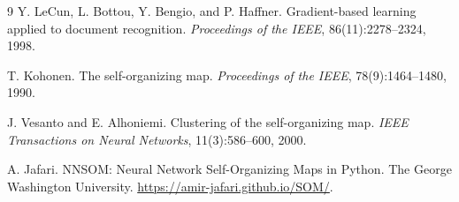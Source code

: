 \documentclass[11pt]{article}
\begin{document}
\begin{thebibliography}{9}
Y. LeCun, L. Bottou, Y. Bengio, and P. Haffner.
\newblock Gradient-based learning applied to document recognition.
\newblock \emph{Proceedings of the IEEE}, 86(11):2278--2324, 1998.

T. Kohonen.
\newblock The self-organizing map.
\newblock \emph{Proceedings of the IEEE}, 78(9):1464--1480, 1990.

J. Vesanto and E. Alhoniemi.
\newblock Clustering of the self-organizing map.
\newblock \emph{IEEE Transactions on Neural Networks}, 11(3):586--600, 2000.

A. Jafari.
\newblock NNSOM: Neural Network Self-Organizing Maps in Python.
\newblock The George Washington University. \url{https://amir-jafari.github.io/SOM/}.
\end{thebibliography}
\end{document}
